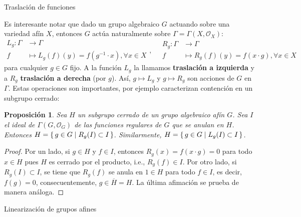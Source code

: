 \documentclass[spanish,12pt]{amsart}
\makeatletter
\renewcommand\subsection{\@startsection{subsection}{2}%
  \z@{.5\linespacing\@plus.7\linespacing}{-.5em}%
  {\normalfont\sffamily}}
\newtheorem{proposition}[theorem]{Proposición}
\theoremstyle{definition}
\theoremstyle{remark}
\numberwithin{equation}{section}
\renewcommand{\bar}[1]{\overline{#1}}
\renewcommand{\O}{\mathcal{O}}
\makeatother
\begin{document}
\subsection{Traslación de funciones}

Es interesante notar que dado un grupo algebraico $G$ actuando sobre una variedad afín $X$, entonces $G$ actúa naturalmente sobre $\Gamma = \Gamma (X, \O_X)$:
\[
    \begin{array}{rl}
    L_g : \Gamma &\longrightarrow \Gamma \\
f &\longmapsto L_g (f) (y) = f(g^{-1} \cdot x) , \forall x \in X
    \end{array}, \quad
    \begin{array}{rl}
    R_g : \Gamma &\longrightarrow \Gamma \\
f &\longmapsto R_g (f) (y) = f(x \cdot g) , \forall x \in X
    \end{array}
\]
para cualquier $g \in G$ fijo. A la función $L_g$ la llamamos \textbf{traslación a izquierda} y a $R_g$ \textbf{traslación a derecha} (por $g$). Así, $g \mapsto L_g$ y $g \mapsto R_g$ son acciones de $G$ en $\Gamma$. Estas operaciones son importantes, por ejemplo caracterizan contención en un subgrupo cerrado:

\begin{proposition}\label{proposition:sea H subgrupo cerrado de grupo algebraico afin G entonces el ideal I de las funciones que se anulan en H determina H por traslacion}
Sea $H$ un subgrupo cerrado de un grupo algebraico afín $G$. Sea $I$ el ideal de $\Gamma (G, \O_G)$ de las funciones regulares de $G$ que se anulan en $H$. Entonces $H = \set{g \in G | R_g (I) \subset I}$. Similarmente, $H = \set{g \in G | L_g (I) \subset I}$.
\end{proposition}
\begin{proof}
Por un lado, si $g \in H$ y $f \in I$, entonces $R_g (x) = f(x \cdot g) = 0$ para todo $x \in H$ pues $H$ es cerrado por el producto, i.e., $R_g (f) \in I$. Por otro lado, si $R_g (I) \subset I$, se tiene que $R_g (f)$ se anula en $1 \in H$ para todo $f \in I$, es decir, $f(g) = 0$, consecuentemente, $g \in \bar H = H$. La última afimación se prueba de manera análoga.
\end{proof}



\subsection{Linearización de grupos afines}
\end{document}

